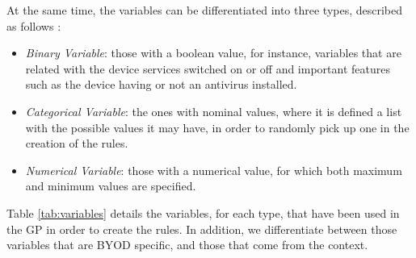 \documentclass[a4paper,10pt,twocolumn,preprint,3p]{elsarticle}
\begin{document}
At the same time, the variables can be differentiated into three types, described as follows \cite{witten2005data}:

\begin{itemize}
\item {\em Binary Variable}: those with a boolean value, for instance, variables that are related with the device services switched on or off and important features such as the device having or not an antivirus installed. %
\item {\em Categorical Variable}: the ones with nominal values, where it is defined a list with the possible values it may have, in order to randomly pick up one in the creation of the rules. %
\item {\em Numerical Variable}: those with a numerical value, for which both maximum and minimum values are specified. %

\end{itemize}

Table \ref{tab:variables} details the variables, for each type, that have been used in the GP in order to create the rules. In addition, we differentiate between those variables that are BYOD specific, and those that come from the context.
\end{document}
